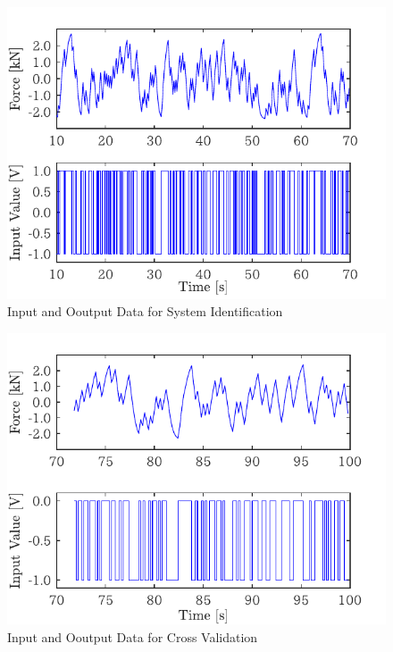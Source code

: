 \begin{figure}[t]
    \centering
        \includegraphics[keepaspectratio, scale=1.0]{contents/システム同定/figure/1018Mseq_inputToFmea_10-70.pdf}
        \caption{Input and Ooutput Data for System Identification}
        \label{fig:1018Mseq_inputToFmea_10-70}
\end{figure}
\begin{figure}[t]
    \centering
        \includegraphics[keepaspectratio, scale=1.0]{contents/システム同定/figure/1018Mseq_inputToFmea_72-100.pdf}
        \caption{Input and Ooutput Data for Cross Validation}
        \label{fig:1018Mseq_inputToFmea_72-100}
\end{figure}
